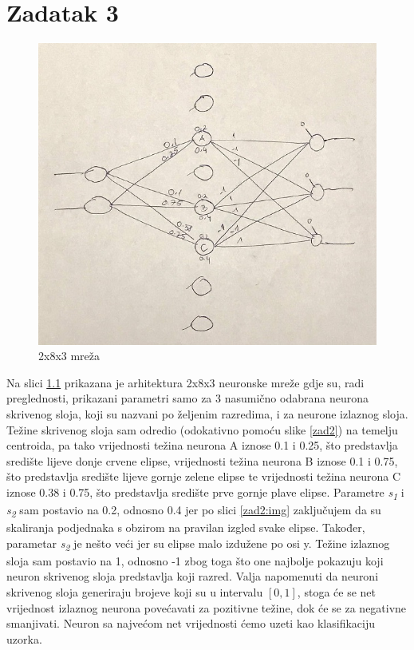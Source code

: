 \documentclass[times, utf8, seminar]{fer}
\begin{document}
\chapter{Zadatak 3}
\begin{figure}[H]
    \centering
    \includegraphics[scale=0.65]{img/zad_3.jpg}
    \caption{2x8x3 mreža}
    \label{zad3:img}
\end{figure}
Na slici \ref{zad3:img} prikazana je arhitektura 2x8x3 neuronske mreže gdje su, radi preglednosti, prikazani parametri samo za 3 nasumično odabrana neurona skrivenog sloja, koji su nazvani po željenim razredima, i za neurone izlaznog sloja. Težine skrivenog sloja sam odredio (odokativno pomoću slike \ref{zad2}) na temelju centroida, pa tako vrijednosti težina neurona A iznose 0.1 i 0.25, što predstavlja središte lijeve donje crvene elipse, vrijednosti težina neurona B iznose 0.1 i 0.75, što predstavlja središte lijeve gornje zelene elipse te vrijednosti težina neurona C iznose 0.38 i 0.75, što predstavlja središte prve gornje plave elipse. Parametre \textit{s\textsubscript{1}} i \textit{s\textsubscript{2}} sam postavio na 0.2, odnosno 0.4 jer po slici \ref{zad2:img} zaključujem da su skaliranja podjednaka s obzirom na pravilan izgled svake elipse. Također, parametar \textit{s\textsubscript{2}} je nešto veći jer su elipse malo izdužene po osi y. Težine izlaznog sloja sam postavio na 1, odnosno -1 zbog toga što one najbolje pokazuju koji neuron skrivenog sloja predstavlja koji razred. Valja napomenuti da neuroni skrivenog sloja generiraju brojeve koji su u intervalu $[0,1]$, stoga će se net vrijednost izlaznog neurona povećavati za pozitivne težine, dok će se za negativne smanjivati. Neuron sa najvećom net vrijednosti ćemo uzeti kao klasifikaciju uzorka.
\end{document}
